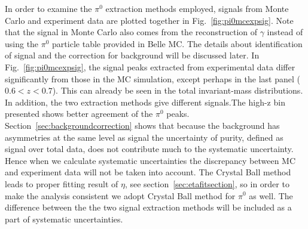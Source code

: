 In order to examine the $\pi^0$ extraction methods employed, signals from Monte Carlo and experiment data are plotted together in Fig.~\ref{fig:pi0mcexpsig}. Note that the signal in Monte Carlo also comes from the reconstruction of $\gamma$ instead of using the $\pi^0$ particle table provided in Belle MC. The details about identification of signal and the correction for background will be discussed later. In Fig.~\ref{fig:pi0mcexpsig}, the signal peaks extracted from experimental data differ significantly from those in the MC simulation, except perhaps in the last panel ($0.6<z<0.7$). This can already be seen in the total invariant-mass distributions. In addition, the two extraction methods give different signals.The high-z bin presented shows better agreement of the $\pi^0$ peaks. Section~\ref{sec:backgroundcorrection} shows that because the background has asymmetries at the same level as signal the uncertainty of purity, defined as signal over total data, does not contribute much to the systematic uncertainty. Hence when we calculate systematic uncertainties the discrepancy between MC and experiment data will not be taken into account. The Crystal Ball method leads to proper fitting result of $\eta$, see section~\ref{sec:etafitsection}, so in order to make the analysis consistent we adopt Crystal Ball method for $\pi^0$ as well. The difference between the the two signal extraction methods will be included as a part of systematic uncertainties.
